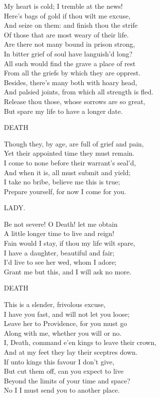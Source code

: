 \begin{dcverse}
My heart is cold; I tremble at the news!\\
Here’s bags of gold if thou wilt me excuse,\\
And seize on them: and finish thou the strife\\
Of those that are most weary of their life.\\
Are there not many bound in prison strong,\\
In bitter grief of soul have languish’d long?\\
All such would find the grave a place of rest\\
From all the griefs by which they are opprest.\\
Besides, there’s many both with hoary head,\\
And palsied joints, from which all strength is fled.\\
Release thou those, whose sorrows are so great,\\
But spare my life to have a longer date.

\vin\vin\vin\vin\vin DEATH

Though they, by age, are full of grief and pain,\\
Yet their appointed time they must remain.\\
I come to none before their warrant’s seal’d,\\
And when it is, all must submit and yield;\\
I take no bribe, believe me this is true;\\
Prepare yourself, for now I come for you.

\vin\vin\vin\vin\vin LADY.

Be not severe! O Death! let me obtain\\
A little longer time to live and reign!\\
Fain would I stay, if thou my life wilt spare,\\
I have a daughter, beautiful and fair;\\
I’d live to see her wed, whom I adore;\\
Grant me but this, and I will ask no more.

\vin\vin\vin\vin\vin DEATH

This is a slender, frivolous excuse,\\
I have you fast, and will not let you loose;\\
Leave her to Providence, for you must go\\
Along with me, whether you will or no.\\
I, Death, command e’en kings to leave their crown,\\
And at my feet they lay their sceptres down.\\
If unto kings this favour I don’t give,\\
But cut them off, can you expect to live\\
Beyond the limits of your time and space?\\
No I I must send you to another place.


\end{dcverse}
